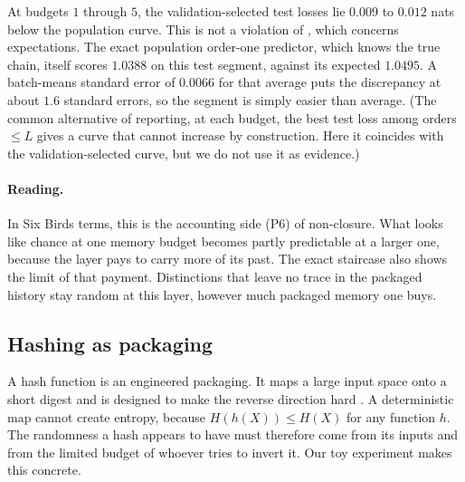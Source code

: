 At budgets $1$ through $5$, the validation-selected test losses lie $0.009$ to $0.012$ nats below the population curve. This is not a violation of , which concerns expectations. The exact population order-one predictor, which knows the true chain, itself scores $1.0388$ on this test segment, against its expected $1.0495$. A batch-means standard error of $0.0066$ for that average puts the discrepancy at about $1.6$ standard errors, so the segment is simply easier than average. (The common alternative of reporting, at each budget, the best test loss among orders $\le L$ gives a curve that cannot increase by construction. Here it coincides with the validation-selected curve, but we do not use it as evidence.)

\paragraph{Reading.} In Six Birds terms, this is the accounting side (P6) of non-closure. What looks like chance at one memory budget becomes partly predictable at a larger one, because the layer pays to carry more of its past. The exact staircase also shows the limit of that payment. Distinctions that leave no trace in the packaged history stay random at this layer, however much packaged memory one buys.

\subsection{Hashing as packaging}\label{sec:results-hashing}

A hash function is an engineered packaging. It maps a large input space onto a short digest and is designed to make the reverse direction hard \citep{rogaway2004cryptographichashfunctionbasics}. A deterministic map cannot create entropy, because $H(h(X))\le H(X)$ for any function $h$. The randomness a hash appears to have must therefore come from its inputs and from the limited budget of whoever tries to invert it. Our toy experiment makes this concrete.

